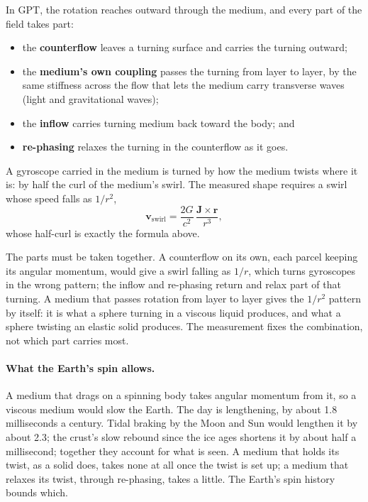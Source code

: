 \documentclass[11pt,a4paper]{article}
\begin{document}
\begin{hypbar}
In GPT, the rotation reaches outward through the medium, and every part of the field takes part:
\begin{itemize}
\item the \textbf{counterflow} leaves a turning surface and carries the turning outward;
\item the \textbf{medium's own coupling} passes the turning from layer to layer, by the same stiffness across the flow that lets the medium carry transverse waves (light and gravitational waves);
\item the \textbf{inflow} carries turning medium back toward the body; and
\item \textbf{re-phasing} relaxes the turning in the counterflow as it goes.
\end{itemize}
A gyroscope carried in the medium is turned by how the medium twists where it is: by half the curl of the medium's swirl. The measured shape requires a swirl whose speed falls as $1/r^2$,
\begin{equation}
\mathbf{v}_{\text{swirl}} = \frac{2G}{c^2}\,\frac{\mathbf{J}\times\mathbf{r}}{r^3},
\end{equation}
whose half-curl is exactly the formula above.
\end{hypbar}

The parts must be taken together. A counterflow on its own, each parcel keeping its angular momentum, would give a swirl falling as $1/r$, which turns gyroscopes in the wrong pattern; the inflow and re-phasing return and relax part of that turning. A medium that passes rotation from layer to layer gives the $1/r^2$ pattern by itself: it is what a sphere turning in a viscous liquid produces, and what a sphere twisting an elastic solid produces. The measurement fixes the combination, not which part carries most. 

\paragraph{What the Earth's spin allows.} A medium that drags on a spinning body takes angular momentum from it, so a viscous medium would slow the Earth. The day is lengthening, by about 1.8 milliseconds a century. Tidal braking by the Moon and Sun would lengthen it by about 2.3; the crust's slow rebound since the ice ages shortens it by about half a millisecond; together they account for what is seen.  A medium that holds its twist, as a solid does, takes none at all once the twist is set up; a medium that relaxes its twist, through re-phasing, takes a little. The Earth's spin history bounds which.
\end{document}
